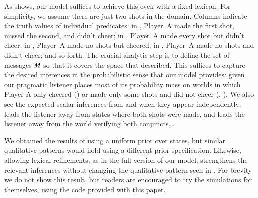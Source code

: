 \documentclass[leqno,12pt]{article}
\begin{document}
As  shows, our model suffices to achieve this
even with a fixed lexicon. For simplicity, we assume there are just
two shots in the domain. Columns indicate the truth values of
individual predicates: in , Player~A made the first
shot, missed the second, and didn't cheer; in ,
Player~A made every shot but didn't cheer; in , Player~A made
no shots but cheered; in \world{$\bullet$}, Player~A made no shots and
didn't cheer; and so forth. The crucial analytic step is to define the
set of messages $M$ so that it covers the space that
\citeauthor{Sauerland01} described. This suffices to capture the
desired inferences in the probabilistic sense that our model provides:
given , our pragmatic listener
 places most of its probability mass on worlds in
which Player A only cheered () or made only some shots and
did not cheer (, ). We also see the
expected scalar inferences from  and  when they
appear independently:  leads
the listener away from states where both shots were made, and
 leads the listener away from
the world verifying both conjuncts, .

We obtained the results of  using a uniform
prior over states, but similar qualitative patterns would hold using a
different prior specification.  Likewise, allowing lexical
refinements, as in the full version of our model, strengthens the
relevant inferences without changing the qualitative pattern seen in
. For brevity we do not show this result, but
readers are encouraged to try the simulations for themselves, using
the code provided with this paper.
\end{document}
